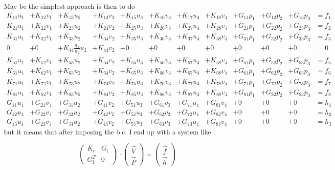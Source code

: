 May be the simplest approach is then to do
{\small
\[
\begin{array}{lllllllllllll}
K_{11} u_1 &+ K_{12} v_1 &+ K_{13} u_2 &+ K_{14} v_2 &+ K_{15} u_3 &+ K_{16} v_3 &+ K_{17}u_4  &+ K_{18}v_4  
&+ G_{11}p_1 &+ G_{12} p_2 &+ G_{13} p_3 & =  f_1 \\
K_{21} u_1 &+ K_{22} v_1 &+ K_{23} u_2 &+ K_{24} v_2 &+ K_{25} u_3 &+ K_{26} v_3 &+ K_{27}u_4  &+ K_{28}v_4  
&+ G_{21}p_1 &+ G_{22} p_2 &+ G_{23} p_3 & =  f_2 \\
K_{31} u_1 &+ K_{32} v_1 &+ K_{33} u_2 &+ K_{34} v_2 &+ K_{35} u_3 &+ K_{36} v_3 &+ K_{37}u_4  &+ K_{38}v_4  
&+ G_{31}p_1 &+ G_{32} p_2 &+ G_{33} p_3 & =  f_3 \\
0 &+ 0 & +K_{44}\frac{n_x}{n_y} u_2 &+ K_{44} v_2 &+ 0 &+ 0 &+ 0  &+ 0  
&+ 0 &+ 0 &+ 0 & =  0 \\
K_{51} u_1 &+ K_{52} v_1 &+ K_{53} u_2 &+ K_{54} v_2 &+ K_{55} u_3 &+ K_{56} v_3 &+ K_{57}u_4  &+ K_{58}v_4  
&+ G_{51}p_1 &+ G_{52} p_2 &+ G_{53} p_3 & =  f_5 \\
K_{61} u_1 &+ K_{62} v_1 &+ K_{63} u_2 &+ K_{64} v_2 &+ K_{65} u_3 &+ K_{66} v_3 &+ K_{67}u_4  &+ K_{68}v_4  
&+ G_{61}p_1 &+ G_{62} p_2 &+ G_{63} p_3 & =  f_6 \\
K_{71} u_1 &+ K_{72} v_1 &+ K_{73} u_2 &+ K_{74} v_2 &+ K_{75} u_3 &+ K_{76} v_3 &+ K_{77}u_4  &+ K_{78}v_4  
&+ G_{71}p_1 &+ G_{72} p_2 &+ G_{73} p_3 & =  f_7 \\
K_{81} u_1 &+ K_{82} v_1 &+ K_{83} u_2 &+ K_{84} v_2 &+ K_{85} u_3 &+ K_{86} v_3 &+ K_{87}u_4  &+ K_{88}v_4  
&+ G_{81}p_1 &+ G_{82} p_2 &+ G_{83} p_3 & =  f_8 \\
G_{11}u_1 &+ G_{21}v_1 &+ G_{31}u_2 &+ G_{41}v_2 &+ G_{51}u_3 &+ G_{61}v_3 &+ G_{71}u_4 &+ G_{81}v_4 &+0&+0&+0&= h_1 \\
G_{12}u_1 &+ G_{22}v_1 &+ G_{32}u_2 &+ G_{42}v_2 &+ G_{52}u_3 &+ G_{62}v_3 &+ G_{72}u_4 &+ G_{82}v_4 &+0&+0&+0&= h_2 \\
G_{13}u_1 &+ G_{23}v_1 &+ G_{33}u_2 &+ G_{43}v_2 &+ G_{53}u_3 &+ G_{63}v_3 &+ G_{73}u_4 &+ G_{83}v_4 &+0&+0&+0&= h_3
\end{array}
\]
}
but it means that after imposing the b.c. I end up with a system like

\[
\left(
\begin{array}{cc}
K_e & G_1 \\
G_1^T & 0
\end{array}
\right)
\cdot
\left(
\begin{array}{c}
\vec{V} \\
\vec{P}
\end{array}
\right)
=\left(
\begin{array}{c}
\vec{f} \\ \vec{h}
\end{array}
\right)
\]



